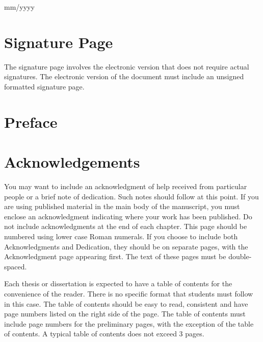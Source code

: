 \documentclass[
  11pt,
]{article}
\begin{document}
\begin{centering}
\normalsize
mm/yyyy

   
\newpage








\section*{Signature Page}

 The signature page involves the electronic version that does not require actual signatures. The electronic version of the document must include an unsigned formatted signature page.
\newpage







\section*{Preface}

 
\newpage







\section*{Acknowledgements}

You may want to include an acknowledgment of help received from particular people or a brief note of dedication. Such notes should follow at this point. If you are using published material in the main body of the manuscript, you must enclose an acknowledgment indicating where your work has been published. Do not include acknowledgments at the end of each chapter. This page should be numbered using lower case Roman numerals. If you choose to include both Acknowledgments and Dedication, they should be on separate pages, with the Acknowledgment page appearing first. The text of these pages must be double-spaced. 

\centering
\raggedright
\newpage
\tableofcontents

Each thesis or dissertation is expected to have a table of contents for the convenience of the reader. There is no specific format that students must follow in this case. The table of contents should be easy to read, consistent and have page numbers listed on the right side of the page. The table of contents must include page numbers for the preliminary pages, with the exception of the table of contents. A typical table of contents does not exceed 3 pages.
\newpage



\end{centering}
\end{document}
